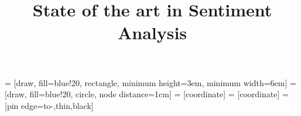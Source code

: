 \documentclass{acm_proc_article-sp}
\begin{document}
 = [draw, fill=blue!20, rectangle, 
    minimum height=3em, minimum width=6em]
 = [draw, fill=blue!20, circle, node distance=1cm]
 = [coordinate]
 = [coordinate]
 = [pin edge={to-,thin,black}]

\title{State of the art in {\ttlit Sentiment Analysis}}


%
%
%
%
%
\end{document}
